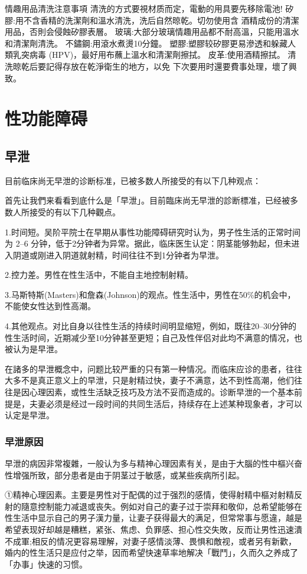 \documentclass[12pt,UTF8]{ctexbook}
\begin{document}
情趣用品清洗注意事項
清洗的方式要視材质而定，電動的用具要先移除電池!
矽膠:用不含香精的洗潔劑和溫水清洗，洗后自然晾乾。切勿使用含
酒精成份的清潔用品，否則会侵蝕矽膠表層。
玻璃:大部分玻璃情趣用品都不耐高溫，只能用溫水和清潔劑清洗。
不鏽鋼:用滾水煮燙10分鐘。
塑膠:塑膠较矽膠更易滲透和躲藏人類乳突病毒
(HPV)，最好用布蘸上溫水和清潔劑擦拭。
皮革:使用酒精擦拭。
清洗晾乾后要記得存放在乾淨衛生的地方，以免
下次要用时還要費事处理，壞了興致。

\part{性功能障碍}

\chapter{早泄}

目前临床尚无早泄的诊断标准，已被多数人所接受的有以下几种观点：

首先让我們来看看到底什么是「早泄」。目前臨床尚无早泄的診断標准，已经被多数人所接受的有以下几种觀点。

1.时间短。吴阶平院士在早期从事性功能障碍研究时认为，男子性生活的正常时间为 2--6 分钟，低于2分钟者为异常。据此，临床医生认定：阴茎能够勃起，但未进入阴道或刚进入阴道就射精，时间往往不到1分钟者为早泄。

2.控力差。男性在性生活中，不能自主地控制射精。

3.马斯特斯(Masters)和詹森(Johnson)的观点。性生活中，男性在50\%的机会中，不能使女性达到性高潮。

4.其他观点。对比自身以往性生活的持续时间明显缩短，例如，既往20--30分钟的性生活时间，近期减少至10分钟甚至更短；自己及性伴侣对此均不满意的情况，也被认为是早泄。

在諸多的早泄概念中，问题比较严重的只有第一种情况。而临床应诊的患者，往往大多不是真正意义上的早泄，只是射精过快，妻子不满意，达不到性高潮，他们往往是因心理因素，或性生活缺乏技巧及方法不妥而造成的。诊断早泄的一个基本前提是，夫妻必须是经过一段时间的共同生活后，持续存在上述某种现象者，才可以认定是早泄。

\section{早泄原因}

早泄的病因非常複雜，一般认为多与精神心理因素有关，是由于大腦的性中樞兴奋性增强所致，部分患者是由于阴茎过于敏感，或某些疾病所引起。

①精神心理因素。主要是男性对于配偶的过于强烈的感情，使得射精中樞对射精反射的隨意控制能力减退或丧失。例如对自己的妻子过于崇拜和敬仰，总希望能够在性生活中显示自己的男子漢力量，让妻子获得最大的满足，但常常事与愿違，越是希望表现好却越是糟糕，紧张、焦虑、负罪感、担心性交失敗，反而让男性迅速潰不成軍;相反的情况更容易理解，对妻子感情淡薄、畏惧和敵视，或者另有新歡，婚内的性生活只是应付之举，因而希望快速草率地解决「戰鬥」，久而久之养成了「办事」快速的习惯。
\end{document}
